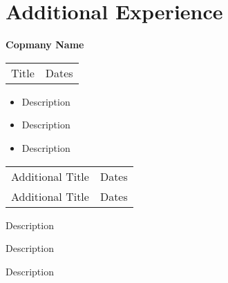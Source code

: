 \section{\sc Additional Experience}

 {\bf{Copmany Name}}\\
\begin{tabular}{@{}p{4in}p{2in}}
    Title & Dates \\
\end{tabular}
\begin{itemize}
    \setlength\itemsep{0em}
    \item Description
    \item Description
    \item Description
\end{itemize}
\begin{tabular}{@{}p{4in}p{2in}}
    Additional Title & Dates \\
    Additional Title & Dates \\
\end{tabular}
\begin{list2}
    \item Description
    \item Description
    \item Description
\end{list2}
\endinput
